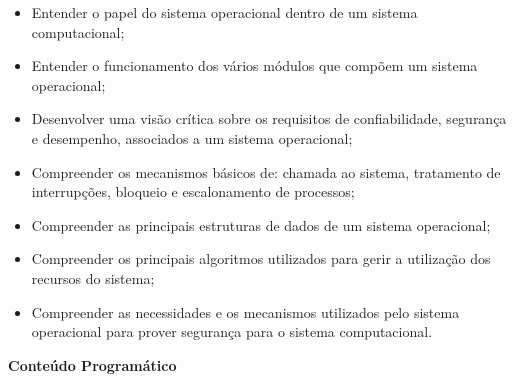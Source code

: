 \begin{itemize}

\item Entender o papel do sistema operacional dentro de um sistema computacional;

\item Entender o funcionamento dos vários módulos que compõem um sistema operacional;

\item Desenvolver uma visão crítica sobre os requisitos de confiabilidade, segurança e desempenho, associados a um sistema operacional;

\item Compreender os mecanismos básicos de: chamada ao sistema, tratamento de interrupções, bloqueio e escalonamento de processos;

\item Compreender as principais estruturas de dados de um sistema operacional;

\item Compreender os principais algoritmos utilizados para gerir a utilização dos recursos do sistema;

\item Compreender as necessidades e os mecanismos utilizados pelo sistema operacional para prover segurança para o sistema computacional.

\end{itemize} 


\begin{snugshade}\begin{center}\textbf{
    Conteúdo Programático
}\end{center}\end{snugshade}

